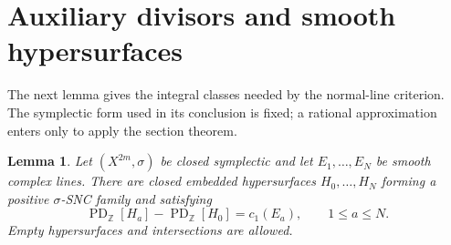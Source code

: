 \documentclass[11pt]{article}
\newtheorem{lemma}[theorem]{Lemma}
\theoremstyle{definition}
\theoremstyle{remark}
\newcommand{\Z}{\mathbb Z}
\newcommand{\PD}{\operatorname{PD}_{\Z}}
\begin{document}

\section{Auxiliary divisors and smooth hypersurfaces}\label{sec:aux}

The next lemma gives the integral classes needed by the normal-line criterion. The symplectic form used in its conclusion is fixed; a rational approximation enters only to apply the section theorem.

\begin{lemma}\label{lem:aux}
Let $(X^{2m},\sigma)$ be closed symplectic and let $E_1,\ldots,E_N$ be smooth complex lines. There are closed embedded hypersurfaces $H_0,\ldots,H_N$ forming a positive $\sigma$-SNC family and satisfying
\begin{equation}\label{eq:chern}
 \PD[H_a]-\PD[H_0]=c_1(E_a),\qquad 1\leq a\leq N.
\end{equation}
Empty hypersurfaces and intersections are allowed.
\end{lemma}
\end{document}
